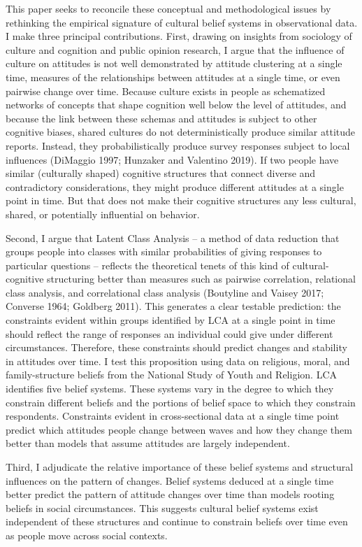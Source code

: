 \documentclass[12pt,]{article}
\begin{document}
This paper seeks to reconcile these conceptual and methodological issues by rethinking the empirical signature of cultural belief systems in observational data. I make three principal contributions. First, drawing on insights from sociology of culture and cognition and public opinion research, I argue that the influence of culture on attitudes is not well demonstrated by attitude clustering at a single time, measures of the relationships between attitudes at a single time, or even pairwise change over time. Because culture exists in people as schematized networks of concepts that shape cognition well below the level of attitudes, and because the link between these schemas and attitudes is subject to other cognitive biases, shared cultures do not deterministically produce similar attitude reports. Instead, they probabilistically produce survey responses subject to local influences (DiMaggio 1997; Hunzaker and Valentino 2019). If two people have similar (culturally shaped) cognitive structures that connect diverse and contradictory considerations, they might produce different attitudes at a single point in time. But that does not make their cognitive structures any less cultural, shared, or potentially influential on behavior.

Second, I argue that Latent Class Analysis -- a method of data reduction that groups people into classes with similar probabilities of giving responses to particular questions -- reflects the theoretical tenets of this kind of cultural-cognitive structuring better than measures such as pairwise correlation, relational class analysis, and correlational class analysis (Boutyline and Vaisey 2017; Converse 1964; Goldberg 2011). This generates a clear testable prediction: the constraints evident within groups identified by LCA at a single point in time should reflect the range of responses an individual could give under different circumstances. Therefore, these constraints should predict changes and stability in attitudes over time. I test this proposition using data on religious, moral, and family-structure beliefs from the National Study of Youth and Religion. LCA identifies five belief systems. These systems vary in the degree to which they constrain different beliefs and the portions of belief space to which they constrain respondents. Constraints evident in cross-sectional data at a single time point predict which attitudes people change between waves and how they change them better than models that assume attitudes are largely independent.

Third, I adjudicate the relative importance of these belief systems and structural influences on the pattern of changes. Belief systems deduced at a single time better predict the pattern of attitude changes over time than models rooting beliefs in social circumstances. This suggests cultural belief systems exist independent of these structures and continue to constrain beliefs over time even as people move across social contexts.
\end{document}

